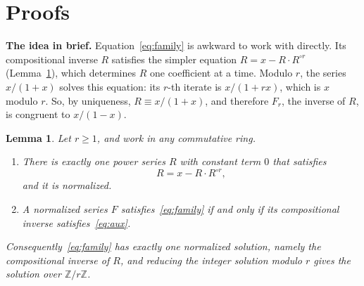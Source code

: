 \documentclass[11pt,a4paper]{article}
\newtheorem{lemma}[theorem]{Lemma}
\theoremstyle{definition}
\theoremstyle{remark}
\newcommand{\Z}{\mathbb{Z}}
\newcommand{\para}[1]{\par\medskip\noindent\textbf{#1}\enspace}
\begin{document}
\section{Proofs}\label{sec:proofs}

\para{The idea in brief.} Equation~\eqref{eq:family} is awkward to work with directly. Its compositional inverse $R$
satisfies the simpler equation $R=x-R\cdot R^{\circ r}$ (Lemma~\ref{lem:aux}), which determines $R$ one coefficient at
a time. Modulo $r$, the series $x/(1+x)$ solves this equation: its $r$-th iterate is $x/(1+rx)$, which is $x$
modulo $r$. So, by uniqueness, $R\equiv x/(1+x)$, and therefore $F_r$, the inverse of $R$, is congruent to $x/(1-x)$.

\begin{lemma}\label{lem:aux}
Let $r\ge1$, and work in any commutative ring.
\begin{enumerate}[label=(\alph*)]
\item There is exactly one power series $R$ with constant term $0$ that satisfies
\begin{equation}\label{eq:aux}
R=x-R\cdot R^{\circ r},
\end{equation}
and it is normalized.
\item A normalized series $F$ satisfies~\eqref{eq:family} if and only if its compositional inverse satisfies~\eqref{eq:aux}.
\end{enumerate}
Consequently~\eqref{eq:family} has exactly one normalized solution, namely the compositional inverse of $R$, and
reducing the integer solution modulo $r$ gives the solution over $\Z/r\Z$.
\end{lemma}
\end{document}

